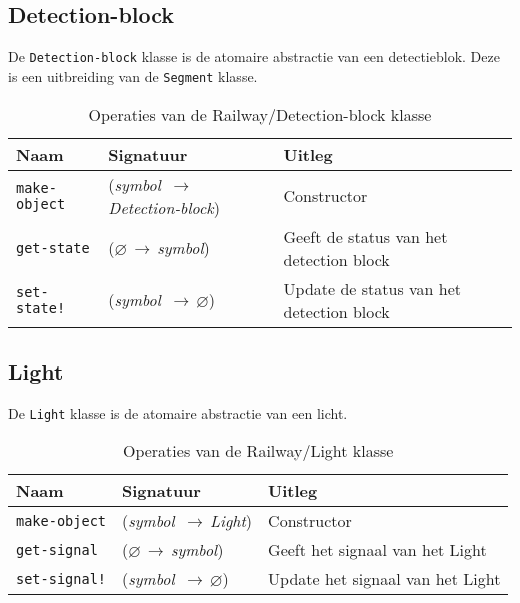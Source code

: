 \documentclass[a4paper, 11pt]{article}
\newcommand{\naar}{\,$\rightarrow$\,}
\renewcommand{\empty}{$\varnothing$}
\newcommand{\<}{\scriptsize\textless\normalsize}
\renewcommand{\>}{\scriptsize\textgreater\normalsize}
\begin{document}
\newpage

\subsection{Detection-block} %
De \texttt{Detection-block} klasse is de atomaire abstractie van een detectieblok. Deze is een uitbreiding van de \texttt{Segment} klasse.
\begin{table}[H]
	\begin{center}
		\begin{tabular}{|l l l|}
			\hline
			\textbf{Naam} & \textbf{Signatuur} & \textbf{Uitleg}\\
			\hline
			\texttt{make-object} & (\textit{symbol} \naar \textit{Detection-block}) & Constructor\\
			\hline
			\texttt{get-state} & (\empty \naar \textit{symbol}) & Geeft de status van het detection block\\
			\texttt{set-state!} & (\textit{symbol} \naar \empty)& Update de status van het detection block\\
			\hline
		\end{tabular}
		\caption{Operaties van de Railway/Detection-block klasse}
	\end{center}
\end{table}

\subsection{Light} %
De \texttt{Light} klasse is de atomaire abstractie van een licht.
\begin{table}[H]
	\begin{center}
		\begin{tabular}{|l l l|}
			\hline
			\textbf{Naam} & \textbf{Signatuur} & \textbf{Uitleg}\\
			\hline
			\texttt{make-object} & (\textit{symbol} \naar \textit{Light}) & Constructor\\
			\hline
			\texttt{get-signal} & (\empty \naar \textit{symbol}) & Geeft het signaal van het Light\\
			\texttt{set-signal!} & (\textit{symbol} \naar \empty) & Update het signaal van het Light\\
			\hline
		\end{tabular}
		\caption{Operaties van de Railway/Light klasse}
	\end{center}
\end{table}
\end{document}
